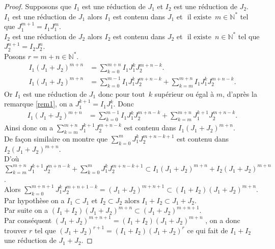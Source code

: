 \begin{proof}
	Supposons que $I_1$ est une réduction de $J_1$ et $I_2$ est une réduction de $J_2$.\\
	$I_1$ est une réduction de $J_1$ alors $I_1 $ est contenu dans $ J_1$ et $\text{ il existe } \, m \in \mathbb{N^*}$ tel que $J_1^{m+1} = I_1 J_1^m$.\\
	$I_2$ est une réduction de $J_2$ alors $I_2 $ est contenu dans $ J_2$ et $\text{ il existe } \, n \in \mathbb{N^*}$ tel que $J_2^{n+1} = I_2 J_2^n$.\\
	Posons $r=m+n \in \mathbb{N^*} $.\\
	\begin{align*}
		I_1(J_1+J_2)^{m+n}& = \displaystyle \sum_{k=0}^{m+n}{I_1 J_1^k J_2^{m+n-k}}.\\
		I_1(J_1+J_2)^{m+n}& = \displaystyle \sum_{k=0}^{m-1}{I_1 J_1^k J_2^{m+n-k}} + \displaystyle \sum_{k=m}^{m+n}{I_1 J_1^k J_2^{m+n-k}}.
	\end{align*}
	Or $I_1$ est une réduction de $J_1$ donc$\text{ pour tout } \, k$ supérieur ou égal à $ m$, d'après la remarque \ref{rem1}, on a $J_1^{k+1} = I_1 J_1^{k}.$ Donc
	\begin{align*}
		I_1(J_1+J_2)^{m+n}& = \displaystyle \sum_{k=0}^{m-1}{I_1 J_1^k J_2^{m+n-k}} + \displaystyle \sum_{k=m}^{m+n}{J_1^{k+1} J_2^{m+n-k}}.
	\end{align*}
	Ainsi donc on a $\displaystyle \sum_{k=m}^{m+n}{J_1^{k+1} J_2^{m+n-k}} $ est contenu dans $  I_1(J_1+J_2)^{m+n}$.\\
	De façon similaire on montre que $\displaystyle \sum_{k=0}^{m}{J_1^{k} J_2^{m+n-k+1}} $ est contenu dans $  I_2(J_1+J_2)^{m+n}.$\\
	D'où $\displaystyle \sum_{k=m}^{m+n}{J_1^{k+1} J_2^{m+n-k}} + \displaystyle \sum_{k=0}^{m}{J_1^{k} J_2^{m+n-k+1}} \subset I_1(J_1+J_2)^{m+n} + I_2(J_1+J_2)^{m+n}$.\\ Alors $\displaystyle \sum_{k=0}^{m+n+1}{J_1^{k} J_2^{m+n+1-k}} = (J_1+J_2)^{m+n+1} \subset (I_1+I_2)(J_1+J_2)^{m+n}$.\\
	Par hypothèse on a $I_1 \subset J_1$ et $I_2 \subset J_2 \text{ alors } I_1+I_2 \subset J_1+J_2$.\\
	Par suite on a $(I_1+I_2)(J_1+J_2)^{m+n} \subset (J_1+J_2)^{m+n+1}$.\\ Par conséquent $(J_1+J_2)^{m+n+1} = (I_1+I_2)(J_1+J_2)^{m+n}$ , on a donc trouver $r$ tel que $(J_1+J_2)^{r+1} = (I_1+I_2)(J_1+J_2)^{r}$ ce qui fait de $I_1+I_2$  une réduction de $J_1+J_2$.
\end{proof}
